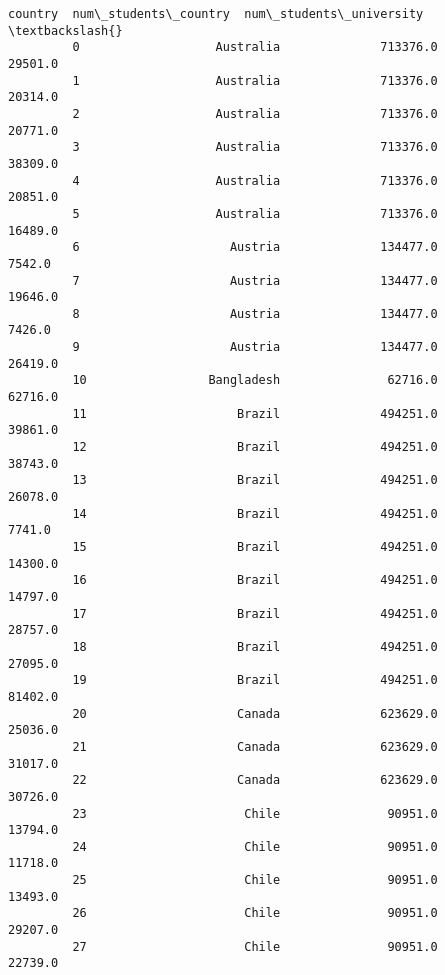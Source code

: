 \documentclass[11pt]{article}
\begin{document}
\begin{Verbatim}[commandchars=\\\{\}]
                               country  num\_students\_country  num\_students\_university  \textbackslash{}
         0                   Australia              713376.0                  29501.0   
         1                   Australia              713376.0                  20314.0   
         2                   Australia              713376.0                  20771.0   
         3                   Australia              713376.0                  38309.0   
         4                   Australia              713376.0                  20851.0   
         5                   Australia              713376.0                  16489.0   
         6                     Austria              134477.0                   7542.0   
         7                     Austria              134477.0                  19646.0   
         8                     Austria              134477.0                   7426.0   
         9                     Austria              134477.0                  26419.0   
         10                 Bangladesh               62716.0                  62716.0   
         11                     Brazil              494251.0                  39861.0   
         12                     Brazil              494251.0                  38743.0   
         13                     Brazil              494251.0                  26078.0   
         14                     Brazil              494251.0                   7741.0   
         15                     Brazil              494251.0                  14300.0   
         16                     Brazil              494251.0                  14797.0   
         17                     Brazil              494251.0                  28757.0   
         18                     Brazil              494251.0                  27095.0   
         19                     Brazil              494251.0                  81402.0   
         20                     Canada              623629.0                  25036.0   
         21                     Canada              623629.0                  31017.0   
         22                     Canada              623629.0                  30726.0   
         23                      Chile               90951.0                  13794.0   
         24                      Chile               90951.0                  11718.0   
         25                      Chile               90951.0                  13493.0   
         26                      Chile               90951.0                  29207.0   
         27                      Chile               90951.0                  22739.0   

\end{Verbatim}
\end{document}

